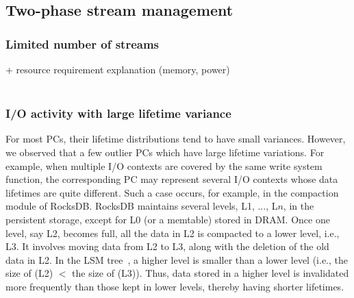 \subsection{Two-phase stream management}
\subsubsection{Limited number of streams}
+ resource requirement explanation (memory, power) \\ \\

\subsubsection{I/O activity with large lifetime variance}
For most PCs, their lifetime distributions tend to have small variances.  
However, we observed that a few outlier PCs which have large lifetime variations. 
For example, when multiple I/O contexts are covered by the same write system function, 
the corresponding PC may represent several I/O contexts whose data lifetimes are quite different.   
Such a case occurs, for example, 
in the compaction module of RocksDB.
RocksDB maintains
several levels, L1, ..., L$n$, in the persistent storage, except for L0 (or a
memtable) stored in DRAM.  Once one level, say L2, becomes full, all the data
in L2 is compacted to a lower level, i.e., L3.  It involves moving data from L2
to L3, along with the deletion of the old data in L2.  In the
LSM tree~\cite{LSM}, a higher level is smaller than a lower level 
(i.e., the size of (L2) $<$ the size of (L3)). 
Thus, data stored in a higher level is invalidated more frequently than those kept
in lower levels, thereby having shorter lifetimes.



